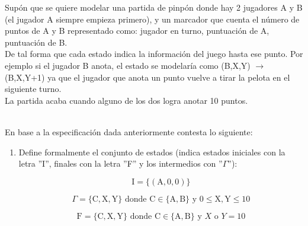     \begin{exercise}
    
        Supón que se quiere modelar una partida de pinpón donde hay 2 jugadores A y B (el jugador A siempre empieza primero), y un marcador que cuenta el número de puntos de A y B representado como: jugador en turno, puntuación de A, puntuación de B. \\ 
   
        De tal forma que cada estado indica la información del juego hasta ese punto. Por ejemplo si el jugador B anota, el estado se modelaría como (B,X,Y) $\rightarrow$ (B,X,Y+1)  ya que el jugador que anota un punto vuelve a tirar la pelota en el siguiente turno.\\
    
        La partida acaba cuando alguno de los dos logra anotar 10 puntos. \\\

        En base a la especificación dada anteriormente contesta lo siguiente:\\

        \begin{enumerate}
            \item Define formalmente el conjunto de estados (indica estados iniciales con la letra  ''I'', finales con la letra  ''F'' y los intermedios con ''$\Gamma$''): 

                \begin{equation}
                    \text{I} = \{(\text{A},0,0)\}\nonumber
                 \end{equation}    

                 \begin{equation}
                    \Gamma = \{\text{C},\text{X},\text{Y}\} \text{ donde } \text{C} \in \{\text{A},\text{B}\} \text{ y } 0 \leq \text{X},\text{Y} \leq 10\nonumber
                 \end{equation}

                \begin{equation}
                    \text{F} =  \{\text{C},\text{X},\text{Y}\} \text{ donde } \text{C} \in \{\text{A},\text{B}\} \text{ y } X \text{ o } Y = 10\nonumber
                \end{equation}


\end{enumerate}
\end{exercise}
